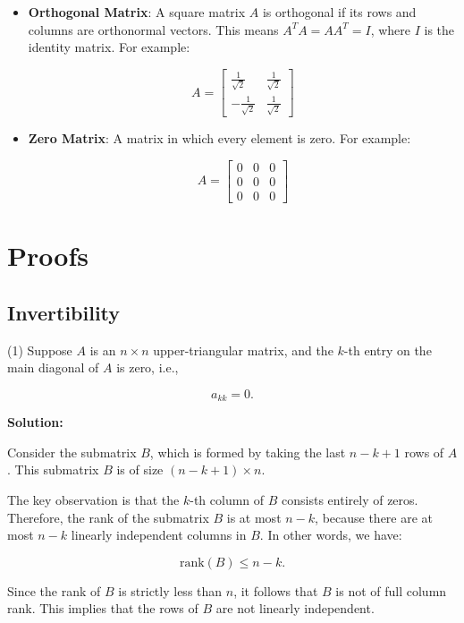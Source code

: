 \documentclass{article}
\begin{document}
\begin{itemize}
    \item \textbf{Orthogonal Matrix}: A square matrix \( A \) is orthogonal if its rows and columns are orthonormal vectors. This means \( A^T A = A A^T = I \), where \( I \) is the identity matrix. For example:

    \[
    A = \begin{bmatrix}
    \frac{1}{\sqrt{2}} & \frac{1}{\sqrt{2}} \\
    -\frac{1}{\sqrt{2}} & \frac{1}{\sqrt{2}}
    \end{bmatrix}
    \]

    \item \textbf{Zero Matrix}: A matrix in which every element is zero. For example:

    \[
    A = \begin{bmatrix}
    0 & 0 & 0 \\
    0 & 0 & 0 \\
    0 & 0 & 0
    \end{bmatrix}
    \]
\end{itemize}

\section{Proofs}
\subsection{Invertibility}

(1) Suppose \( A \) is an \( n \times n \) upper-triangular matrix, and the \( k \)-th entry on the main diagonal of \( A \) is zero, i.e.,

\[
a_{kk} = 0.
\]

\textbf{Solution:}

Consider the submatrix \( B \), which is formed by taking the last \( n-k+1 \) rows of \( A \). This submatrix \( B \) is of size \( (n-k+1) \times n \).

The key observation is that the \( k \)-th column of \( B \) consists entirely of zeros. Therefore, the rank of the submatrix \( B \) is at most \( n-k \), because there are at most \( n-k \) linearly independent columns in \( B \). In other words, we have:

\[
\text{rank}(B) \leq n-k.
\]

Since the rank of \( B \) is strictly less than \( n \), it follows that \( B \) is not of full column rank. This implies that the rows of \( B \) are not linearly independent.
\end{document}
